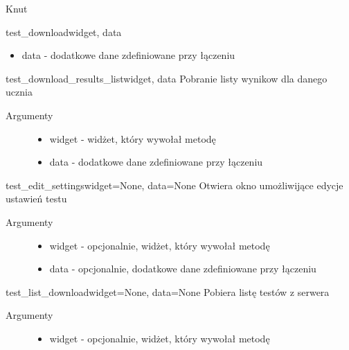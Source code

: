 \documentclass[letterpaper,10pt,polish]{manual}
\begin{document}
\begin{classdesc}{Knut}{}
\begin{methoddesc}{test\_download}{widget, data}
\begin{description}
\begin{itemize}
\item {} 
data  - dodatkowe dane zdefiniowane przy łączeniu

\end{itemize}

\end{description}
\end{methoddesc}

\hypertarget{Knut.Knut.test\_download\_results\_list}{}\begin{methoddesc}{test\_download\_results\_list}{widget, data}
Pobranie listy wynikow dla danego ucznia
\begin{description}
\item[Argumenty] \leavevmode\begin{itemize}
\item {} 
widget - widżet, który wywołał metodę

\item {} 
data  - dodatkowe dane zdefiniowane przy łączeniu

\end{itemize}

\end{description}
\end{methoddesc}

\hypertarget{Knut.Knut.test\_edit\_settings}{}\begin{methoddesc}{test\_edit\_settings}{widget=None, data=None}
Otwiera okno umożliwijące edycje ustawień testu
\begin{description}
\item[Argumenty] \leavevmode\begin{itemize}
\item {} 
widget - opcjonalnie, widżet, który wywołał metodę

\item {} 
data  - opcjonalnie, dodatkowe dane zdefiniowane przy łączeniu

\end{itemize}

\end{description}
\end{methoddesc}

\hypertarget{Knut.Knut.test\_list\_download}{}\begin{methoddesc}{test\_list\_download}{widget=None, data=None}
Pobiera listę testów z serwera
\begin{description}
\item[Argumenty] \leavevmode\begin{itemize}
\item {} 
widget - opcjonalnie, widżet, który wywołał metodę


\end{itemize}
\end{description}
\end{methoddesc}
\end{classdesc}
\end{document}
